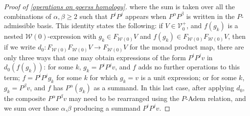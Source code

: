 \documentclass[11pt]{amsart}
\theoremstyle{plain}
\theoremstyle{definition}
\renewcommand{\to}{\longrightarrow}
\newcommand{\calV}{\mathcal{V}}
\newcommand{\calw}{\mathcal{W}}
\theoremstyle{plain}
\newcommand{\vect}[2]{\calV^{#1}_{#2}}
\begin{document}
\begin{Cohomology operations for all unstable Lie algebras}
\begin{proof}[Proof of \ref{operations on goerss homology}]
where the sum is taken over all the combinations of $\alpha,\beta\geq2$ such that $P^iP^j$ appears when $P^\alpha P^\beta$ is written in the $P$-admissible basis. This identity states the following: if $V\in\vect{+}{0}$, and $f(g_k)$ is a nested $\calw(0)$-expression with $g_k\in F_{\calw(0)}V$ and $f(g_k)\in F_{\calw(0)}F_{\calw(0)}V$, then if we write $d_0:F_{\calw(0)}F_{\calw(0)}V\to F_{\calw(0)}V$ for the monad product map, there are only three ways that one may obtain expressions of the form $P^iP^jv$ in $d_0(f(g_k))$: for some $k$, $g_k=P^iP^jv$, and $f $ adds no further operations to this term; $f=P^iP^jg_{k}$ for some $k$ for which $g_{k}=v$ is a unit expression; or for some $k$, $g_k=P^\beta v$, and  $f$ has $P^\alpha(g_k)$ as a summand. In this last case, after applying $d_0$, the composite $P^{\alpha}P^{\beta}v$ may need to be rearranged using the $P$-Adem relation, and we sum over those $\alpha$,$\beta$ producing a summand $P^iP^jv$.


\end{proof}
\end{Cohomology operations for all unstable Lie algebras}
\end{document}
